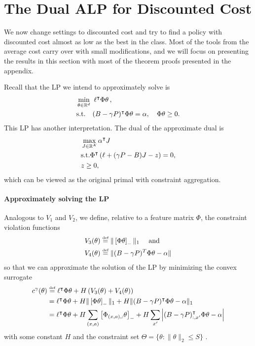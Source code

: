 \documentclass[11pt]{article}
\newcommand{\df}{\stackrel{\mbox{\rm\tiny def}}{=}}
\begin{document}
\section{The Dual ALP for Discounted Cost}
\label{sec:discounted_cost}
We now change settings to discounted cost and try to find a policy with discounted cost almost as low as the best in the class. Most of the tools from the average cost carry over with small modifications, and we will focus on presenting the results in this section with most of the theorem proofs presented in the appendix. 

Recall that the LP we intend to approximately solve is
\begin{align*}
&\min_{\theta\in\Reals^{d}}~ \ell^\top\Phi\theta\,, \\%
&\mbox{s.t.} \quad (B - \gamma P)^\top \Phi\theta  = \alpha,\quad \Phi\theta\geq 0.
\end{align*}
This LP has another interpretation. The dual of the approximate dual is
\begin{align*}
    & \max_{J \in \mathbb R^{{\cal X}}}  \alpha^\intercal J  \\
    & \mbox{s.t.}          \Phi^\intercal \left( \ell + (\gamma P- B) J - z \right) =0, \\
    &                     z \geq 0,
\end{align*}
which can be viewed as the original primal with constraint aggregation.

\paragraph{Approximately solving the LP}
Analogous to $V_1$ and $V_2$, we define, relative to a feature matrix $\Phi$, the constraint violation functions
\begin{align*}
  V_3(\theta) & \df  \|\left[\Phi \theta \right]_{-}\|_1 \quad \text{ and }\\
  V_4(\theta) & \df \|(B-\gamma P)^T \Phi \theta  -\alpha\|
\end{align*}
so that we can approximate the solution of the LP by minimizing the convex surrogate
\begin{align}
\label{eqn:discounted_surrogate}
  c^\gamma(\theta)
  &\df \ell^\top \Phi\theta + H\left( V_3(\theta) + V_4(\theta)\right) \\
  & =
    \ell^\top \Phi \theta  + H \|\left[\Phi \theta \right]_{-}\|_1
    + H  \|(B-\gamma P)^\top \Phi \theta -\alpha \|_1 \notag\\
& =
    \ell^\top \Phi \theta  + H \sum_{(x,a)}\left[\Phi_{(x,a),:} \theta \right]_{-}
    + H\sum_{x'}  \left|(B-\gamma P)_{:,x'}^\top \Phi \theta -\alpha \right| \notag
\end{align}
with some constant $H$ and the constraint set $\Theta=\{\theta: \|\theta\|_2 \leq S\}$ .
\end{document}
